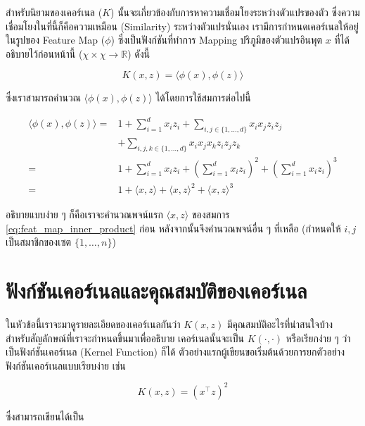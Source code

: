 สำหรับนิยามของเคอร์เนล ($K$) นั้นจะเกี่ยวข้องกับการหาความเชื่อมโยงระหว่างตัวแปรของตัว ซึ่งความเชื่อมโยงในที่นี้ก็คือความเหมือน (Similarity)
ระหว่างตัวแปรนั่นเอง เรามีการกำหนดเคอร์เนลให้อยู่ในรูปของ Feature Map ($\phi$) ซึ่งเป็นฟังก์ชันที่ทำการ Mapping ปริภูมิของตัวแปรอินพุต $x$
ที่ได้อธิบายไว้ก่อนหน้านี้ ($\chi \times \chi \rightarrow \mathbb{R}$) ดังนี้

\begin{equation}
    K(x,z) = \langle\phi(x),\phi(z)\rangle
\end{equation}

\noindent ซึ่งเราสามารถคำนวณ $\langle\phi(x),\phi(z)\rangle$ ได้โดยการใช้สมการต่อไปนี้

\begin{align}
    \langle\phi(x),\phi(z)\rangle =& 1 + \sum_{i=1}^d x_i z_i + \sum_{i,j\in\{1,\ldots,d\}} x_i x_j z_i z_j \\
    &+ \sum_{i,j,k \in \{1,\ldots,d\}} x_i x_j x_k z_i z_j z_k \nonumber \\
    =& 1 + \sum_{i=1}^d x_i z_i + \left(\sum_{i=1}^d x_i z_i \right)^2 + \left( \sum_{i=1}^d x_i z_i \right)^3 \\
    =& 1 + \langle x,z \rangle + \langle x,z \rangle^2 + \langle x,z \rangle^3\label{eq:feat_map_inner_product}
\end{align}

\noindent อธิบายแบบง่าย ๆ ก็คือเราจะคำนวณพจน์แรก $ \langle x,z \rangle$ ของสมการ \ref{eq:feat_map_inner_product} ก่อน 
หลังจากนั้นจึงคำนวณพจน์อื่น ๆ ที่เหลือ (กำหนดให้ $i,j$ เป็นสมาชิกของเซต $\{1, \dots, n\}$)

\section{ฟังก์ชันเคอร์เนลและคุณสมบัติของเคอร์เนล}

ในหัวข้อนี้เราจะมาดูรายละเอียดของเคอร์เนลกันว่า $K(x,z)$ มีคุณสมบัติอะไรที่น่าสนใจบ้าง สำหรับสัญลักษณ์ที่เราจะกำหนดขึ้นมาเพื่ออธิบาย%
เคอร์เนลนั้นจะเป็น $K(\cdot,\cdot)$ หรือเรียกง่าย ๆ ว่าเป็นฟังก์ชันเคอร์เนล (Kernel Function) ก็ได้ 
ตัวอย่างแรกผู้เขียนขอเริ่มต้นด้วยการยกตัวอย่างฟังก์ชันเคอร์เนลแบบเรียบง่าย เช่น

\begin{equation}
    K(x,z) = (x^{\top} z)^{2}
\end{equation}

\noindent ซึ่งสามารถเขียนได้เป็น

